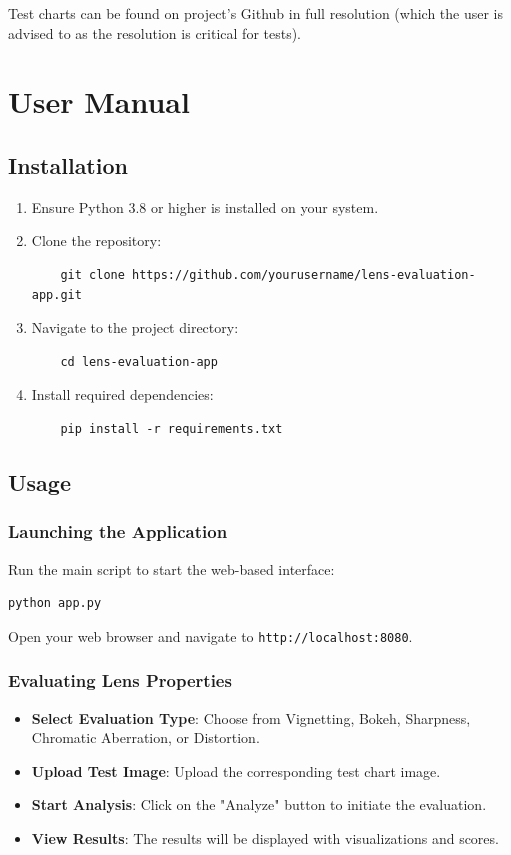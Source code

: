 Test charts can be found on project's Github in full resolution (which the user is advised to as the resolution is critical for tests).

\chapter{User Manual}
\label{app:user_manual}

\section{Installation}
\begin{enumerate}
    \item Ensure Python 3.8 or higher is installed on your system.
    \item Clone the repository:
    \begin{verbatim}
    git clone https://github.com/yourusername/lens-evaluation-app.git
    \end{verbatim}
    \item Navigate to the project directory:
    \begin{verbatim}
    cd lens-evaluation-app
    \end{verbatim}
    \item Install required dependencies:
    \begin{verbatim}
    pip install -r requirements.txt
    \end{verbatim}
\end{enumerate}

\section{Usage}
\subsection{Launching the Application}
Run the main script to start the web-based interface:
\begin{verbatim}
python app.py
\end{verbatim}
Open your web browser and navigate to \texttt{http://localhost:8080}.

\subsection{Evaluating Lens Properties}
\begin{itemize}
    \item \textbf{Select Evaluation Type}: Choose from Vignetting, Bokeh, Sharpness, Chromatic Aberration, or Distortion.
    \item \textbf{Upload Test Image}: Upload the corresponding test chart image.
    \item \textbf{Start Analysis}: Click on the "Analyze" button to initiate the evaluation.
    \item \textbf{View Results}: The results will be displayed with visualizations and scores.
\end{itemize}
